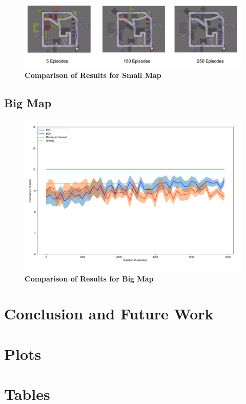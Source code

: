\documentclass[12pt]{report}
\begin{document}
\begin{figure}[!h]
    \centering
    \includegraphics[width=16cm]{PPO.png}
    \caption{\textbf{Comparison of Results for Small Map}}
    \label{fig:x}
\end{figure}

\section{Big Map}

\begin{figure}[!h]
    \centering
    \includegraphics[width=12cm]{30.png}
    \caption{\textbf{Comparison of Results for Big Map}}
    \label{fig:x}
\end{figure}

\chapter{Conclusion and Future Work}
\appendix
\chapter{Plots}
\chapter{Tables}





\begin{thesisauthorvita}             
\end{thesisauthorvita}               
\end{document}

